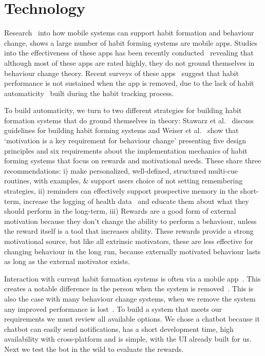\documentclass{scaffold/sigchi}
\begin{document}
\section{Technology}
Research~\cite{survey_on_apps_2,survey_on_current_apps_of_steel} into how mobile systems can support habit formation and behaviour change, shows a large number of habit forming systems are mobile apps. Studies into the effectiveness of these apps has been recently conducted~\cite{article_beyond_self_tracking_designing_apps, article_dont_kick_habit} revealing that although most of these apps are rated highly, they do not ground themselves in behaviour change theory. Recent surveys of these apps~\cite{survey_on_current_apps_of_steel,survey_on_apps_2} suggest that habit performance is not sustained when the app is removed, due to the lack of habit automaticity~\cite{article_beyond_self_tracking_designing_apps} built during the habit tracking process.

To build automaticity, we turn to two different strategies for building habit formation systems that do ground themselves in theory: Stawarz et al.~\cite{article_beyond_self_tracking_designing_apps} discuss guidelines for building habit forming systems and Weiser et al.~\cite{article_taxonomy_motivational_affordances_meaningful} show that `motivation is a key requirement for behaviour change' presenting five design principles and six requirements about the implementation mechanics of habit forming systems that focus on rewards and motivational needs. These share three recommendations: i) make personalized, well-defined, structured multi-cue routines, with examples, \& support users choice of not setting remembering strategies, ii) reminders can effectively support prospective memory in the short-term, increase the logging of health data~\cite{the_power_of_logging_mobile_notifications} and educate them about what they should perform in the long-term, iii) Rewards are a good form of external motivation because they don't change the ability to perform a behaviour, unless the reward itself is a tool that increases ability. These rewards provide a strong motivational source, but like all extrinsic motivators, these are less effective for changing behaviour in the long run, because externally motivated behaviour lasts as long as the external motivator exists.

Interaction with current habit formation systems is often via a mobile app~\cite{article_beyond_self_tracking_designing_apps, article_dont_kick_habit}. This creates a notable difference in the person when the system is removed~\cite{article_my_phone_is_part_of_my_soul}.
This is also the case with many behaviour change systems, when we remove the system any improved performance is lost~\cite{article_dont_kick_habit, article_realtime_feedback_improving_medication_taking}. To build a system that meets our requirements we must review all available options. We chose a chatbot because it chatbot can easily send notifications, has a short development time, high availability with cross-platform and is simple, with the UI already built for us. Next we test the bot in the wild to evaluate the rewards.
\end{document}

